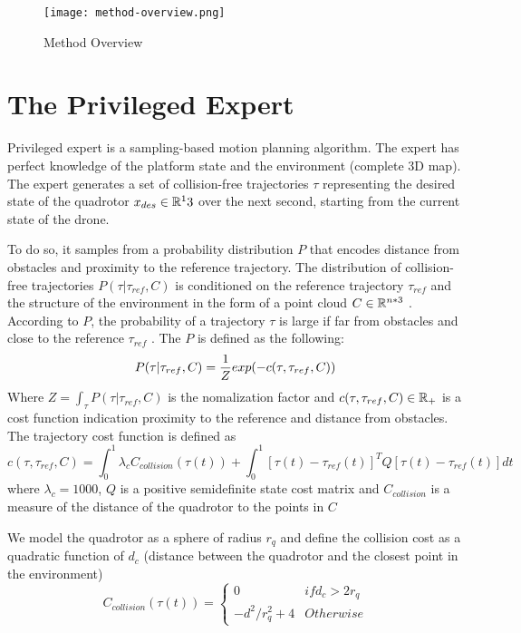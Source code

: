 \begin{figure}[!h]
	\centering
	\texttt{[image: method-overview.png]}
	\caption{Method Overview}
	\label{fig:method-overview}
	
\end{figure}

\section{The Privileged Expert}
Privileged expert is a sampling-based motion planning algorithm.
The expert has perfect knowledge of the platform state and the environment (complete 3D map). The expert generates a set of collision-free trajectories $\tau$ representing the desired state of the quadrotor $x_{des} \in \mathbb{R}^13$ over the
next second, starting from the current state of the drone.

To do so, it samples from a probability distribution $P$ that encodes distance from obstacles and proximity to the reference trajectory. The distribution of collision-free trajectories $P(\tau | \tau_{ref}, C)$ is
conditioned on the reference trajectory $\tau_{ref}$ and the structure of the
environment in the form of a point cloud $C \in \mathbb{R}^{n*3}$ . According to $P$,
the probability of a trajectory $\tau$ is large if far from obstacles and close
to the reference $\tau_{ref}$ . The $P$ is defined as the following:
\begin{equation}
	P(\tau | \tau_{ref},C) = \frac{1}{Z} exp(-c(\tau, \tau_{ref},C)) \\
\end{equation}
Where $	Z = \int_{\tau} P(\tau | \tau_{ref},C)$ is the nomalization factor and $c(\tau, \tau_{ref},C) \in \mathbb{R}_+$ is a cost function indication proximity to the reference and distance from obstacles. The trajectory cost function is defined as 
\begin{equation}
	c(\tau, \tau_{ref},C) = \int_0^1 \lambda_c C_{collision}(\tau(t)) + \int_0^1 [\tau(t)-\tau_{ref}(t)]^T Q[\tau(t)-\tau_{ref}(t)]{dt}
	\label{eqn:collision}
\end{equation}
where $\lambda_c = 1000$, $Q$ is a positive semidefinite state cost matrix and $C_{collision}$ is a measure of the distance of the quadrotor to the points in $C$

We model the quadrotor as a sphere of radius $r_q$ and define the collision cost as a quadratic function of $d_c$ (distance between the quadrotor and the closest point in the environment)
\begin{equation}
	C_{collision}(\tau(t)) = 
	\begin{cases}
		0 & if d_c > 2r_q \\
		-d^2/r_q^2 + 4 & Otherwise
	\end{cases}
\end{equation}

